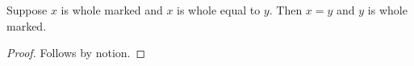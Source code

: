 

\begin{proposition}\label{whole_equality_stays_exact}
    Suppose $x$ is whole marked and $x$ is whole equal to $y$.
    Then $x=y$ and $y$ is whole marked.
\end{proposition}
\begin{proof}
    Follows by notion.
\end{proof}
